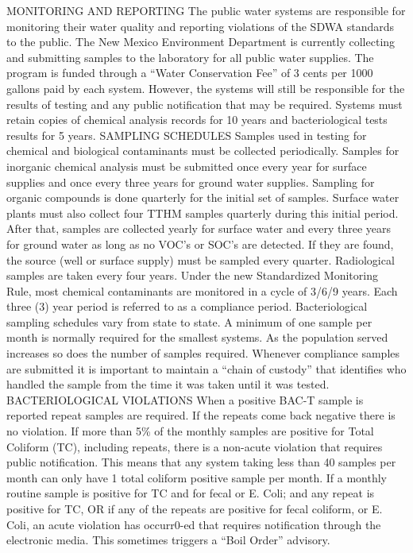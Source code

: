 MONITORING AND REPORTING The public water systems are responsible for monitoring their water quality and reporting violations of the SDWA standards to the public. The New Mexico Environment Department is currently collecting and submitting samples to the laboratory for all public water supplies. The program is funded through a “Water Conservation Fee” of 3 cents per 1000 gallons paid by each system. However, the systems will still be responsible for the results of testing and any public notification that may be required. Systems must retain copies of chemical analysis records for 10 years and bacteriological tests results for 5 years. SAMPLING SCHEDULES Samples used in testing for chemical and biological contaminants must be collected periodically. Samples for inorganic chemical analysis must be submitted once every year for surface supplies and once every three years for ground water supplies. Sampling for organic compounds is done quarterly for the initial set of samples. Surface water plants must also collect four TTHM samples quarterly during this initial period. After that, samples are collected yearly for surface water and every three years for ground water as long as no VOC’s or SOC’s are detected. If they are found, the source (well or surface supply) must be sampled every quarter. Radiological samples are taken every four years. Under the new Standardized Monitoring Rule, most chemical contaminants are monitored in a cycle of 3/6/9 years. Each three (3) year period is referred to as a compliance period. Bacteriological sampling schedules vary from state to state. A minimum of one sample per month is normally required for the smallest systems. As the population served increases so does the number of samples required. Whenever compliance samples are submitted it is important to maintain a “chain of custody” that identifies who handled the sample from the time it was taken until it was tested.  \\
BACTERIOLOGICAL VIOLATIONS When a positive BAC-T sample is reported repeat samples are required. If the repeats come back negative there is no violation. If more than 5\% of the monthly samples are positive for Total Coliform (TC), including repeats, there is a non-acute violation that requires public notification. This means that any system taking less than 40 samples per month can only have 1 total coliform positive sample per month. If a monthly routine sample is positive for TC and for fecal or E. Coli; and any repeat is positive for TC, OR if any of the repeats are positive for fecal coliform, or E. Coli, an acute violation has occurr0-ed that requires notification through the electronic media. This sometimes triggers a “Boil Order” advisory.  \\
